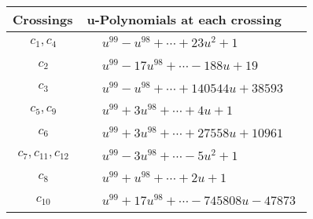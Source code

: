 \documentclass[1p]{elsarticle_modified}
\theoremstyle{definition}
\begin{document}
\begin{tabular}{m{50pt}|m{274pt}}
Crossings & \hspace{64pt}u-Polynomials at each crossing \\
\hline $$\begin{aligned}c_{1},c_{4}\end{aligned}$$&$\begin{aligned}
&u^{99}- u^{98}+\cdots+23 u^2+1
\end{aligned}$\\
\hline $$\begin{aligned}c_{2}\end{aligned}$$&$\begin{aligned}
&u^{99}-17 u^{98}+\cdots-188 u+19
\end{aligned}$\\
\hline $$\begin{aligned}c_{3}\end{aligned}$$&$\begin{aligned}
&u^{99}- u^{98}+\cdots+140544 u+38593
\end{aligned}$\\
\hline $$\begin{aligned}c_{5},c_{9}\end{aligned}$$&$\begin{aligned}
&u^{99}+3 u^{98}+\cdots+4 u+1
\end{aligned}$\\
\hline $$\begin{aligned}c_{6}\end{aligned}$$&$\begin{aligned}
&u^{99}+3 u^{98}+\cdots+27558 u+10961
\end{aligned}$\\
\hline $$\begin{aligned}c_{7},c_{11},c_{12}\end{aligned}$$&$\begin{aligned}
&u^{99}-3 u^{98}+\cdots-5 u^2+1
\end{aligned}$\\
\hline $$\begin{aligned}c_{8}\end{aligned}$$&$\begin{aligned}
&u^{99}+u^{98}+\cdots+2 u+1
\end{aligned}$\\
\hline $$\begin{aligned}c_{10}\end{aligned}$$&$\begin{aligned}
&u^{99}+17 u^{98}+\cdots-745808 u-47873
\end{aligned}$\\
\hline
\end{tabular}\newpage\renewcommand{\arraystretch}{1}
\end{document}
